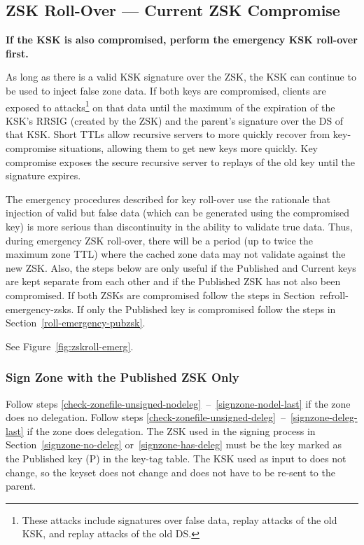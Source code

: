 
\clearpage
\subsection{ZSK Roll-Over --- Current ZSK Compromise}
\label{roll-emergency-curzsk}

{\bf If the KSK is also compromised, perform the emergency KSK roll-over first.}

As long as there is a valid KSK signature over the ZSK, the KSK can continue
to be used to inject false zone data.  If both keys are compromised, clients
are exposed to attacks\footnote{These attacks include signatures over false
data, replay attacks of the old KSK, and replay attacks of the old DS.} on
that data until the maximum of the expiration of the KSK's RRSIG (created by
the ZSK) and the parent's signature over the DS of that KSK.  Short TTLs allow
recursive servers to more quickly recover from key-compromise situations,
allowing them to get new keys more quickly.  Key compromise exposes the secure
recursive server to replays of the old key until the signature expires.

The emergency procedures described for key roll-over use the rationale that
injection of valid but false data (which can be generated using the
compromised key) is more serious than discontinuity in the ability to validate
true data. Thus, during emergency ZSK roll-over, there will be a period (up
to twice the maximum zone TTL) where the cached zone data may not validate
against the new ZSK. Also, the steps below are only useful if the Published
and Current keys are kept separate from each other and if the Published ZSK
has not also been compromised. If both ZSKs are compromised follow the steps
in Section~ref{roll-emergency-zsks}.  If only the Published key is compromised
follow the steps in Section~\ref{roll-emergency-pubzsk}.

See Figure~\ref{fig:zskroll-emerg}.






\subsubsection{Sign Zone with the Published ZSK Only}

Follow steps \ref{check-zonefile-unsigned-nodeleg}~--~\ref{signzone-nodel-last}
if the zone does no delegation.  Follow steps
\ref{check-zonefile-unsigned-deleg}~--~\ref{signzone-deleg-last} if the
zone does delegation.  The ZSK used in the signing process in
Section~\ref{signzone-no-deleg} or~\ref{signzone-has-deleg} must be the key
marked as the Published key (P) in the key-tag table. The KSK used
as input to  does not change, so the keyset does not
change and does not have to be re-sent to the parent.





